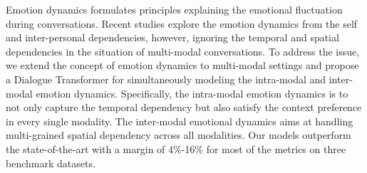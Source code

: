 Emotion dynamics formulates principles explaining the emotional fluctuation during conversations. Recent studies explore the emotion dynamics from the self and inter-personal dependencies, however, ignoring the temporal and spatial dependencies in the situation of multi-modal conversations. To address the issue, we extend the concept of emotion dynamics to multi-modal settings and propose a Dialogue Transformer for simultaneously modeling the intra-modal and inter-modal emotion dynamics. Specifically, the intra-modal emotion dynamics is to not only capture the temporal dependency but also satisfy the context preference in every single modality. The inter-modal emotional dynamics aims at handling multi-grained spatial dependency across all modalities. Our models outperform the state-of-the-art with a margin of 4\%-16\% for most of the metrics on three benchmark datasets.
